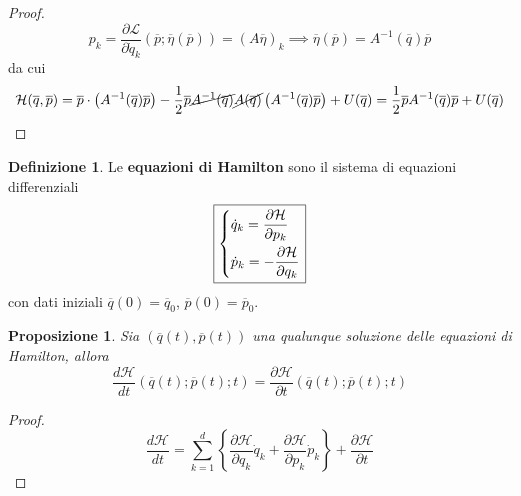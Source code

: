 \documentclass{book}
\theoremstyle{plain}
\theoremstyle{plain}
\theoremstyle{plain}
\theoremstyle{plain}
\theoremstyle{plain}
\newtheorem{prop}{Proposizione}[chapter]
\theoremstyle{definition}
\newtheorem{defi}{Definizione}[chapter]
\theoremstyle{remark}
\theoremstyle{definition}
\begin{document}
\begin{proof}
    \begin{displaymath}
        p_k=\frac{\partial\mathcal{L}}{\partial\Dot{q}_k}\left(\overline{p};\overline{\eta}(\overline{p})\right)=\left(A\overline{\eta}\right)_k\implies\overline{\eta}(\overline{p})=A^{-1}(\overline{q})\overline{p}
    \end{displaymath}
    da cui
    \begin{displaymath}
        \mathcal{H}(\overline{q},\overline{p})=\overline{p}\cdot\left(A^{-1}(\overline{q})\overline{p}\right)-\frac{1}{2}\overline{p}\cancel{A^{-1}(\overline{q})}\cancel{A(\overline{q})}\left(A^{-1}(\overline{q})\overline{p}\right)+U(\overline{q})=\frac{1}{2}\overline{p}A^{-1}(\overline{q})\overline{p}+U(\overline{q})
    \end{displaymath}
\end{proof}

\begin{defi}
    Le \textbf{equazioni di Hamilton} sono il sistema di equazioni differenziali
    \begin{equation*}
    \boxed{
        \begin{dcases}
            \dot{q}_k=\frac{\partial\mathcal{H}}{\partial p_k} \\
            \dot{p}_k=-\frac{\partial\mathcal{H}}{\partial q_k}
        \end{dcases}
            }
    \end{equation*}
    con dati iniziali $\overline{q}(0)=\overline{q}_0$, $\overline{p}(0)=\overline{p}_0$.
\end{defi}

\begin{prop}
     Sia $(\overline{q}(t),\overline{p}(t))$ una qualunque soluzione delle equazioni di Hamilton, allora 
     \begin{displaymath}
     \boxed{
         \frac{d\mathcal{H}}{dt}(\overline{q}(t);\overline{p}(t);t)=\frac{\partial\mathcal{H}}{\partial t}(\overline{q}(t);\overline{p}(t);t)
         }
     \end{displaymath}
\end{prop}

\begin{proof}
    \begin{displaymath}
        \frac{d\mathcal{H}}{dt}=\sum_{k=1}^d\left\{
        \frac{\partial\mathcal{H}}{\partial q_k}\Dot{q}_k+\frac{\partial\mathcal{H}}{\partial p_k}\Dot{p}_k\right\}+\frac{\partial\mathcal{H}}{\partial t}
    \end{displaymath}
\end{proof}
\end{document}
